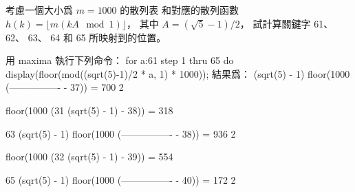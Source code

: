 \startEXERCISE
考慮一個大小爲 $m=1000$ 的散列表
和對應的散列函數 $h(k)=\lfloor m(kA\mod 1)\rfloor$，
其中 $A=(\sqrt{5}-1)/2$，
試計算關鍵字 61、 62、 63、 64 和 65 所映射到的位置。
\stopEXERCISE

\startANSWER
用 maxima 執行下列命令：
\startcodebox
for a:61 step 1 thru 65 do
	display(floor(mod((sqrt(5)-1)/2 * a, 1) * 1000));
\stopcodebox
結果爲：
 (sqrt(5) - 1)
 floor(1000 (---------------- - 37)) = 700
                    2

 floor(1000 (31 (sqrt(5) - 1) - 38)) = 318

             63 (sqrt(5) - 1)
 floor(1000 (---------------- - 38)) = 936
                    2

 floor(1000 (32 (sqrt(5) - 1) - 39)) = 554

             65 (sqrt(5) - 1)
 floor(1000 (---------------- - 40)) = 172
                    2
\stopcodebox
\stopANSWER
